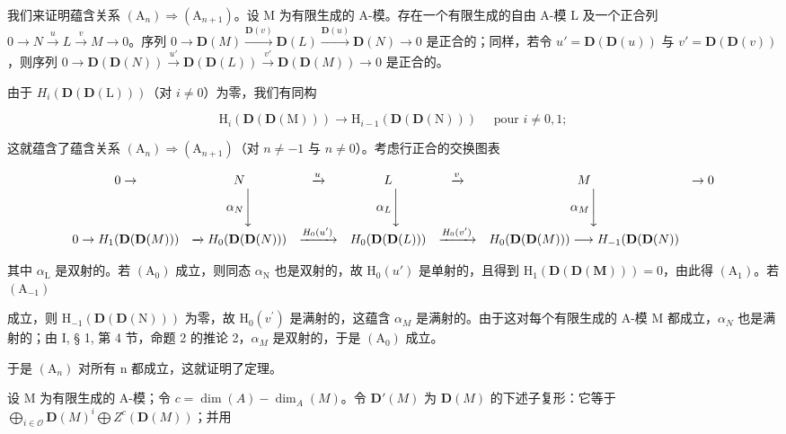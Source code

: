 我们来证明蕴含关系 \((\mathrm{A}_{n}) \Rightarrow (\mathrm{A}_{n+1})\)。设 M 为有限生成的 A-模。存在一个有限生成的自由 A-模 L 及一个正合列 \(0 \to N \xrightarrow{u} L \xrightarrow{v} M \to 0\)。序列 \(0 \to \mathbf{D}(M) \xrightarrow{\mathbf{D}(v)} \mathbf{D}(L) \xrightarrow{\mathbf{D}(u)} \mathbf{D}(N) \to 0\) 是正合的；同样，若令 \(u' = \mathbf{D}(\mathbf{D}(u))\) 与 \(v' = \mathbf{D}(\mathbf{D}(v))\)，则序列 \(0 \to \mathbf{D}(\mathbf{D}(N)) \xrightarrow{u'} \mathbf{D}(\mathbf{D}(L)) \xrightarrow{v'} \mathbf{D}(\mathbf{D}(M)) \to 0\) 是正合的。

由于 \(H_{i}(\mathbf{D}(\mathbf{D}(\mathrm{L})))\)（对 \(i \neq 0\)）为零，我们有同构

\[
\mathrm{H} _ {i} (\mathbf {D} (\mathbf {D} (\mathrm{M}))) \longrightarrow \mathrm{H} _ {i - 1} (\mathbf {D} (\mathbf {D} (\mathrm{N}))) \quad \text { pour } i \neq 0, 1;
\]

这就蕴含了蕴含关系 \((\mathrm{A}_{n})\Rightarrow(\mathrm{A}_{n+1})\)（对 \(n\neq-1\) 与 \(n\neq0\)）。考虑行正合的交换图表

\[
\begin{array}{c c c c c c c} 0 \to & N & \xrightarrow {u} & L & \xrightarrow {v} & M & \to 0 \\ & \alpha_ {N} \Bigg \downarrow & & \alpha_ {L} \Bigg \downarrow & & \alpha_ {M} \Bigg \downarrow \\ 0 \to H _ {1} (\mathbf {D} (\mathbf {D} (M))) & \xrightarrow {} H _ {0} (\mathbf {D} (\mathbf {D} (N))) & \xrightarrow {H _ {0} (u ^ {\prime})} & H _ {0} (\mathbf {D} (\mathbf {D} (L))) & \xrightarrow {H _ {0} (v ^ {\prime})} & H _ {0} (\mathbf {D} (\mathbf {D} (M))) \longrightarrow H _ {- 1} (\mathbf {D} (\mathbf {D} (N)) \end{array}
\]

其中 \(\alpha_{\mathrm{L}}\) 是双射的。若 \((\mathrm{A}_0)\) 成立，则同态 \(\alpha_{\mathrm{N}}\) 也是双射的，故 \(\mathrm{H}_0(u')\) 是单射的，且得到 \(\mathrm{H}_1(\mathbf{D}(\mathbf{D}(\mathbf{M}))) = 0\)，由此得 \((\mathrm{A}_1)\)。若 \((\mathrm{A}_{-1})\)

成立，则 \(\mathrm{H}_{-1}(\mathbf{D}(\mathbf{D}(\mathrm{N})))\) 为零，故 \(\mathrm{H}_{0}(v^{\prime})\) 是满射的，这蕴含 \(\alpha_{M}\) 是满射的。由于这对每个有限生成的 A-模 M 都成立，\(\alpha_{N}\) 也是满射的；由 I, § 1, 第 4 节，命题 2 的推论 2，\(\alpha_{M}\) 是双射的，于是 \((\mathrm{A}_{0})\) 成立。

于是 \((\mathrm{A}_{n})\) 对所有 n 都成立，这就证明了定理。

设 M 为有限生成的 A-模；令 \(c = \dim(A) - \dim_{A}(M)\)。令 \(\mathbf{D}'(M)\) 为 \(\mathbf{D}(M)\) 的下述子复形：它等于 \(\bigoplus_{i\in\mathcal{O}}\mathbf{D}(M)^{i}\bigoplus Z^{c}(\mathbf{D}(M))\)；并用

